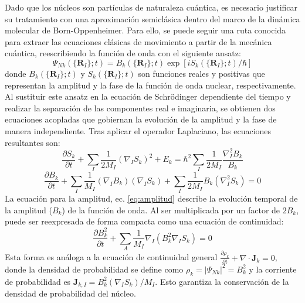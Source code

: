 Dado que los núcleos son partículas de naturaleza cuántica, es necesario justificar su tratamiento con una aproximación semiclásica dentro del marco de la dinámica molecular de Born-Oppenheimer. Para ello, se puede seguir una ruta conocida para extraer las ecuaciones clásicas de movimiento a partir de la mecánica cuántica, reescribiendo la función de onda con el siguiente ansatz: 
\begin{equation}
    \Psi_{Nk}(\{\mathbf{R}_I\};t) = B_k(\{\mathbf{R}_I\};t) \exp[iS_k(\{\mathbf{R}_I\};t)/\hbar]
    \label{eq:ansatz_semiclasico} 
\end{equation}
donde $B_k(\{\mathbf{R}_I\};t)$ y $S_k(\{\mathbf{R}_I\};t)$ son funciones reales y positivas que representan la amplitud y la fase de la función de onda nuclear, respectivamente.
Al sustituir este ansatz en la ecuación de Schrödinger dependiente del tiempo y realizar la separación de las componentes real e imaginaria, se obtienen dos ecuaciones acopladas que gobiernan la evolución de la amplitud y la fase de manera independiente. Tras aplicar el operador Laplaciano, las ecuaciones resultantes son:
\begin{equation}
    \frac{\partial S_k}{\partial t} + \sum_I \frac{1}{2M_I}(\nabla_I S_k)^2 + E_k = \hbar^2 \sum_I \frac{1}{2M_I} \frac{\nabla_I^2 B_k}{B_k}
    \label{eq:fase} 
\end{equation}
\begin{equation}
    \frac{\partial B_k}{\partial t} + \sum_I \frac{1}{M_I}(\nabla_I B_k)(\nabla_I S_k) + \sum_I \frac{1}{2M_I} B_k (\nabla_I^2 S_k) = 0
    \label{eq:amplitud} 
\end{equation}
La ecuación para la amplitud, ec. \eqref{eq:amplitud} describe la evolución temporal de la amplitud ($B_k$) de la función de onda. Al ser multiplicada por un factor de $2B_k$, puede ser reexpresada de forma compacta como una ecuación de continuidad:
\begin{equation}
    \frac{\partial B_k^2}{\partial t} + \sum_A \frac{1}{M_I} \nabla_I(B_k^2 \nabla_I S_k) = 0
    \label{eq:continuidad_reescrita} 
\end{equation}
Esta forma es análoga a la ecuación de continuidad general $\frac{\partial \rho_k}{\partial t} + \nabla \cdot \mathbf{J}_k = 0$, donde la densidad de probabilidad se define como $\rho_k = |\Psi_{Nk}|^2 = B_k^2$ y la corriente de probabilidad es $\mathbf{J}_{k,I} = B_k^2(\nabla_I S_k)/M_I$. Esto garantiza la conservación de la densidad de probabilidad del núcleo. 

